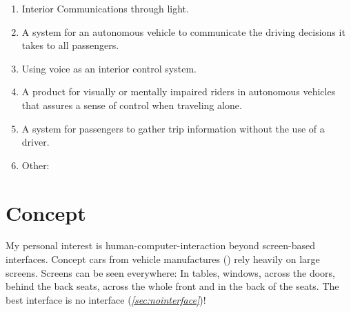     \begin{enumerate}
    \item Interior Communications through light.
    \item A system for an autonomous vehicle to communicate the driving decisions it takes to all passengers.
    \item Using voice as an interior control system.
    \item A product for visually or mentally impaired riders in autonomous vehicles that assures a sense of control when traveling alone.
    \item A system for passengers to gather trip information without the use of a driver.
    \item Other:
    \end{enumerate}

\section{Concept}
\label{sec:concept}
My personal interest is human-computer-interaction beyond screen-based interfaces. Concept cars from vehicle manufactures (\emph{}) rely heavily on large screens. Screens can be seen everywhere: In tables, windows, across the doors, behind the back seats, across the whole front and in the back of the seats. The best interface is no interface (\emph{\autoref{sec:nointerface}})! 

